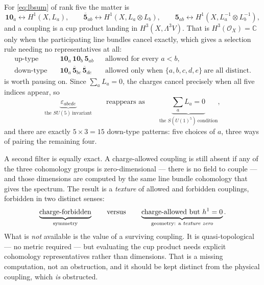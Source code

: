 \documentclass[11pt,a4paper]{article}
\newcommand{\cO}{\mathcal{O}}
\theoremstyle{definition}
\begin{document}
For \cref{eq:lbsum} of rank five the matter is
%
\begin{equation}
\mathbf{10}_a \leftrightarrow H^1(X, L_a),
\qquad
\overline{\mathbf{5}}_{ab} \leftrightarrow H^1(X, L_a \otimes L_b),
\qquad
\mathbf{5}_{ab} \leftrightarrow H^1(X, L_a^{-1} \otimes L_b^{-1}),
\end{equation}
%
and a coupling is a cup product landing in
$H^3(X, \Lambda^3 V) $. That is $H^3(\cO_X) = \mathbb{C}$ only when the
participating line bundles cancel exactly, which gives a selection rule
needing no representatives at all:
%
\begin{align}
\text{up-type} \quad
&\mathbf{10}_a\, \mathbf{10}_b\, \mathbf{5}_{ab}
&&\text{allowed for every } a < b,
\label{eq:upsel}\\[2pt]
\text{down-type} \quad
&\mathbf{10}_a\, \overline{\mathbf{5}}_{bc}\, \overline{\mathbf{5}}_{de}
&&\text{allowed only when } \{a,b,c,d,e\} \ \text{are all distinct.}
\label{eq:downsel}
\end{align}
%
 is worth pausing on. Since $\sum_a L_a = 0$, the charges
cancel precisely when all five indices appear, so
%
\begin{equation}
\underbrace{\varepsilon_{abcde}}_{\text{the } SU(5) \ \text{invariant}}
\qquad\text{reappears as}\qquad
\underbrace{\textstyle\sum_a L_a = 0}_{\text{the } S(U(1)^5) \ \text{condition}} ,
\end{equation}
%
and there are exactly $5 \times 3 = 15$ down-type patterns: five choices of
$a$, three ways of pairing the remaining four.

A second filter is equally exact. A charge-allowed coupling is still absent if
any of the three cohomology groups is zero-dimensional --- there is no field to
couple --- and those dimensions are computed by the same line bundle
cohomology that gives the spectrum. The result is a \emph{texture} of allowed
and forbidden couplings, forbidden in two distinct senses:
%
\begin{equation}
\underbrace{\text{charge-forbidden}}_{\text{symmetry}}
\qquad\text{versus}\qquad
\underbrace{\text{charge-allowed but } h^1 = 0}_{\text{geometry: a \emph{texture zero}}} .
\end{equation}
%
What is \emph{not} available is the value of a surviving coupling. It is
quasi-topological --- no metric required --- but evaluating the cup product
needs explicit cohomology representatives rather than dimensions. That is a
missing computation, not an obstruction, and it should be kept distinct from
the physical coupling, which \emph{is} obstructed.
\end{document}
